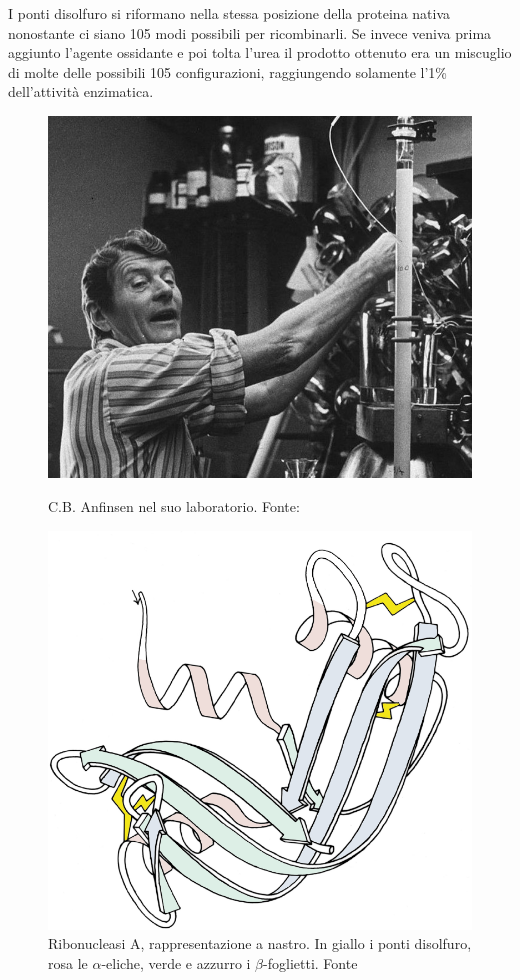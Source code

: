 I ponti disolfuro si riformano nella stessa posizione della proteina nativa nonostante ci siano 105 modi possibili per ricombinarli. Se invece veniva prima aggiunto l'agente ossidante e poi tolta l'urea il prodotto ottenuto era un miscuglio di molte delle possibili 105 configurazioni, raggiungendo solamente l'1\% dell'attività enzimatica.

\begin{figure}[!htb]
	\centering
	\includegraphics[scale=0.25]{images/anfinsen.jpg}
	\caption{C.B. Anfinsen nel suo laboratorio. Fonte: \cite{anfinsenNIH}}
	\label{fig:anfinsen}
	\endminipage\hfill
	\centering
	\includegraphics[scale=0.2]{images/RibonucleaseA_SS_paleRib.png}
	\caption{Ribonucleasi A, rappresentazione a nastro. In giallo i ponti disolfuro, rosa le $\alpha$-eliche, verde e azzurro i $\beta$-foglietti. Fonte \cite{ribonucleasi-file}}
	\label{fig:ribonucleasi}
	\endminipage\hfill
\end{figure}


